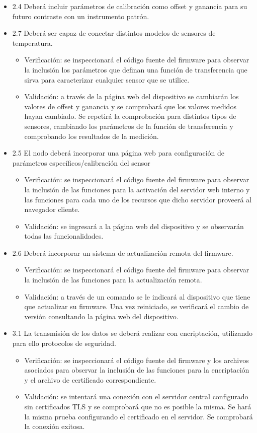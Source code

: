 \documentclass[11pt]{proyecto}
\begin{document}
\begin{itemize}
\item 2.4 Deberá incluir parámetros de calibración como offset y ganancia para su futuro contraste con un instrumento patrón.
\item 2.7 Deberá ser capaz de conectar distintos modelos de sensores de temperatura.
\begin{itemize}
\item Verificación: se inspeccionará el código fuente del firmware para observar la inclusión los parámetros que definan una función de transferencia que sirva para caracterizar cualquier sensor que se utilice.
\item Validación: a través de la página web del dispositivo se cambiarán los valores de offset y ganancia y se comprobará que los valores medidos hayan cambiado. Se repetirá la comprobación para distintos tipos de sensores, cambiando los parámetros de la función de transferencia y comprobando los resultados de la medición.
\end{itemize}

\item 2.5 El nodo deberá incorporar una página web para configuración de parámetros específicos/calibración del sensor
\begin{itemize}
\item Verificación: se inspeccionará el código fuente del firmware para observar la inclusión de las funciones para la activación del servidor web interno y las funciones para cada uno de los recursos que dicho servidor proveerá al navegador cliente.
\item Validación: se ingresará a la página web del dispositivo y se observarán todas las funcionalidades.
\end{itemize}


\item 2.6 Deberá incorporar un sistema de actualización remota del firmware.
\begin{itemize}
\item Verificación: se inspeccionará el código fuente del firmware para observar la inclusión de las funciones para la actualización remota.
\item Validación: a través de un comando se le indicará al dispositivo que tiene que actualizar su firmware. Una vez reiniciado, se verificará el cambio de versión consultando la página web del dispositivo.
\end{itemize}

\item 3.1 La transmisión de los datos se deberá realizar con encriptación, utilizando para ello protocolos de seguridad.
\begin{itemize}
\item Verificación: se inspeccionará el código fuente del firmware y los archivos asociados para observar la inclusión de las funciones para la encriptación y el archivo de certificado correspondiente.
\item Validación: se intentará una conexión con el servidor central configurado sin certificados TLS y se comprobará que no es posible la misma. Se hará la misma prueba configurando el certificado en el servidor. Se comprobará la conexión exitosa.
\end{itemize}


\end{itemize}
\end{document}
